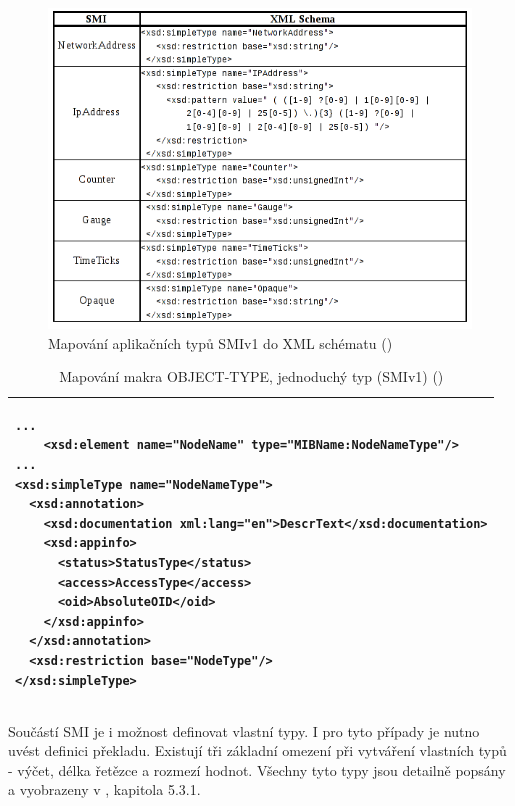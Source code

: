 \begin{figure}[htp]
	\begin{center}
		\includegraphics{obrazky/03_mapovani_smiv1.png}
		\caption{Mapování aplikačních typů SMIv1 do XML schématu (\cite{macejko_dipl})}
		\label{obr_xml_smi1_typy}
	\end{center}
\end{figure}

\begin{table}
	\centering
	{\footnotesize
	  \begin{tabular}{|p{15cm}|}
      \hline
\begin{verbatim}...
    <xsd:element name="NodeName" type="MIBName:NodeNameType"/>
...
<xsd:simpleType name="NodeNameType">
  <xsd:annotation>
    <xsd:documentation xml:lang="en">DescrText</xsd:documentation>
    <xsd:appinfo>
      <status>StatusType</status>
      <access>AccessType</access>
      <oid>AbsoluteOID</oid>
    </xsd:appinfo>
  </xsd:annotation>
  <xsd:restriction base="NodeType"/>
</xsd:simpleType>\end{verbatim}\\
      \hline
    \end{tabular}
  }
	\caption{Mapování makra OBJECT-TYPE, jednoduchý typ (SMIv1) (\cite{macejko_dipl})}
	\label{tab_xml_smi1_simple_type}
\end{table}

Součástí SMI je i možnost definovat vlastní typy. I pro tyto případy je nutno uvést definici překladu. Existují tři základní omezení při vytváření vlastních typů -
výčet, délka řetězce a rozmezí hodnot. Všechny tyto typy jsou detailně popsány a vyobrazeny v \cite{macejko_dipl}, kapitola 5.3.1.

